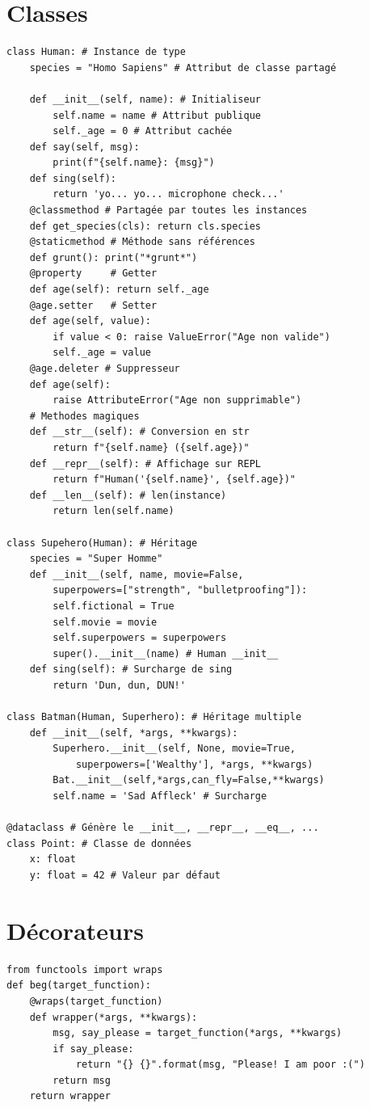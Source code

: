 \documentclass{article}
\begin{document}
\begin{multicols*}{4}
\section*{Classes}
\begin{lstlisting}
class Human: # Instance de type
    species = "Homo Sapiens" # Attribut de classe partagé

    def __init__(self, name): # Initialiseur
        self.name = name # Attribut publique
        self._age = 0 # Attribut cachée
    def say(self, msg):
        print(f"{self.name}: {msg}")
    def sing(self):
        return 'yo... yo... microphone check...'
    @classmethod # Partagée par toutes les instances
    def get_species(cls): return cls.species
    @staticmethod # Méthode sans références
    def grunt(): print("*grunt*")
    @property     # Getter
    def age(self): return self._age
    @age.setter   # Setter
    def age(self, value):
        if value < 0: raise ValueError("Age non valide")
        self._age = value
    @age.deleter # Suppresseur
    def age(self):
        raise AttributeError("Age non supprimable")
    # Methodes magiques
    def __str__(self): # Conversion en str
        return f"{self.name} ({self.age})"
    def __repr__(self): # Affichage sur REPL
        return f"Human('{self.name}', {self.age})"
    def __len__(self): # len(instance)
        return len(self.name)

class Supehero(Human): # Héritage
    species = "Super Homme"
    def __init__(self, name, movie=False,
        superpowers=["strength", "bulletproofing"]):
        self.fictional = True
        self.movie = movie
        self.superpowers = superpowers
        super().__init__(name) # Human __init__
    def sing(self): # Surcharge de sing
        return 'Dun, dun, DUN!'

class Batman(Human, Superhero): # Héritage multiple
    def __init__(self, *args, **kwargs):
        Superhero.__init__(self, None, movie=True,
            superpowers=['Wealthy'], *args, **kwargs)
        Bat.__init__(self,*args,can_fly=False,**kwargs)
        self.name = 'Sad Affleck' # Surcharge

@dataclass # Génère le __init__, __repr__, __eq__, ...
class Point: # Classe de données
    x: float
    y: float = 42 # Valeur par défaut
\end{lstlisting}

\section*{Décorateurs}
\begin{lstlisting}
from functools import wraps
def beg(target_function):
    @wraps(target_function)
    def wrapper(*args, **kwargs):
        msg, say_please = target_function(*args, **kwargs)
        if say_please:
            return "{} {}".format(msg, "Please! I am poor :(")
        return msg
    return wrapper


\end{lstlisting}
\end{multicols*}
\end{document}
